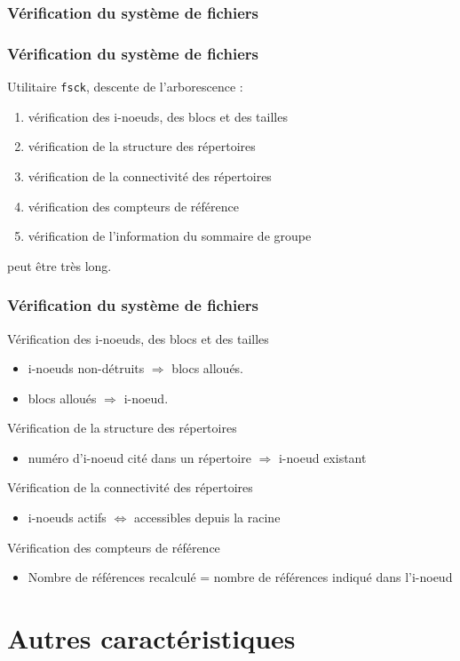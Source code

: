 \subsubsection{Vérification du système de fichiers}
\begin{frame}
  \frametitle{Vérification du système de fichiers}
  Utilitaire \texttt{fsck}, descente de l'arborescence :
  
  \begin{enumerate}
  \item vérification des i-noeuds, des blocs et des tailles
  \item vérification de la structure des répertoires
  \item vérification de la connectivité des répertoires
  \item vérification des compteurs de référence
  \item vérification de l'information du sommaire de groupe
  \end{enumerate}
   peut être très long.
\end{frame}

\begin{frame}
  \frametitle{Vérification du système de fichiers}
  Vérification des i-noeuds, des blocs et des tailles
  \begin{itemize}
  \item i-noeuds non-détruits $\Rightarrow$ blocs alloués.
  \item blocs alloués $\Rightarrow$ i-noeud.
  \end{itemize}
  Vérification de la structure des répertoires
    \begin{itemize}
    \item numéro d'i-noeud cité dans un répertoire $\Rightarrow$
      i-noeud existant
    \end{itemize}
    Vérification de la connectivité des répertoires
      \begin{itemize}
      \item i-noeuds actifs $\Leftrightarrow$ accessibles depuis la racine
      \end{itemize}
      Vérification des compteurs de référence
      \begin{itemize}
      \item Nombre de références recalculé = nombre de références indiqué dans l'i-noeud
      \end{itemize}
\end{frame}

\section{Autres caractéristiques}
